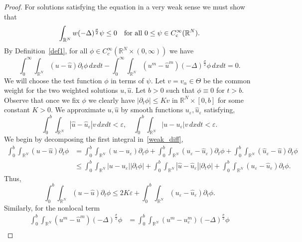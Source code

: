 \documentclass[leqno,12pt]{amsart}
\theoremstyle{definition}
\theoremstyle{remark}
\numberwithin{equation}{section}
\begin{document}
\begin{proof}
For solutions satisfying the equation in a very weak sense we must show that 
\[
    \int_{\mathbb{R}^N}w(-\Delta)^{\frac\sigma2}\psi\leq 0\quad\textup{for all } 0\leq\psi\in C^{\infty}_{\textup{c}}(\mathbb{R}^N).
\]
By Definition~\ref{def1}, for all $\phi\in C^{\infty}_c(\mathbb{R}^N\times (0,\infty))$ we have
\begin{equation}\label{weak_diff}
    \int_{0}^{\infty}\int_{\mathbb{R}^N}(u-\hat{u})\partial_t\phi \,dxdt-\int_{0}^{\infty}\int_{\mathbb{R}^N}(u^m-\hat{u}^m)(-\Delta)^{\frac\sigma2}\phi \,dxdt=0.
\end{equation}
We will choose the test function $\phi$ in terms of $\psi$. Let $v=v_\alpha\in \Theta$ be the common weight for the two weighted solutions $u,\hat{u}$. Let $b>0$ such that $\phi\equiv 0$ for $t>b$. Observe that once we fix $\phi$ we clearly have $|\partial_t\phi|\le Kv$ in $\mathbb{R}^N\times[0,b]$ for some constant $K>0$. We approximate $u,\hat{u}$ by smooth functions $u_\varepsilon,\hat{u}_\varepsilon$ satisfying, 
\begin{equation}\label{5}
 \int_{0}^{b}\int_{\mathbb{R}^N}|\hat{u}-\hat{u}_{\varepsilon}|v\,dxdt<\varepsilon,\quad \int_{0}^{b}\int_{\mathbb{R}^N}|u-u_{\varepsilon}|v\,dxdt<\varepsilon.
\end{equation}
We begin by decomposing the first integral in~\eqref{weak_diff},
\begin{align*}
\displaystyle \int_{0}^{b}\int_{\mathbb{R}^N}(u-\hat{u})\partial_t\phi&\displaystyle= \int_{0}^{b}\int_{\mathbb{R}^N}(u-u_{\varepsilon})\partial_t\phi+ \int_{0}^{b}\int_{\mathbb{R}^N}(u_{\varepsilon}-\hat{u}_{\varepsilon})\partial_t\phi+ \int_{0}^{b}\int_{\mathbb{R}^N}(\hat{u}_{\varepsilon}-\hat{u})\partial_t\phi \\[3mm]
&\displaystyle\leq \int_{0}^{b}\int_{\mathbb{R}^N}|u-u_{\varepsilon}||\partial_t\phi|+ \int_{0}^{b}\int_{\mathbb{R}^N}|\hat{u}-\hat{u}_{\varepsilon}||\partial_t\phi|+ \int_{0}^{b}\int_{\mathbb{R}^N}(u_{\varepsilon}-\hat{u}_{\varepsilon})\partial_t\phi.
\end{align*}
Thus, 
\begin{equation}\label{6}
    \int_{0}^{b}\int_{\mathbb{R}^N}(u-\hat{u})\partial_t\phi\leq 2K\varepsilon+ \int_{0}^{b}\int_{\mathbb{R}^N}(u_{\varepsilon}-\hat{u}_{\varepsilon})\partial_t\phi.
    \end{equation}
Similarly, for the nonlocal term 
\begin{align*}
    \int_{0}^{b}\int_{\mathbb{R}^N}(u^m-\hat{u}^m)(-\Delta)^{\frac\sigma2}\phi&= \int_{0}^{b}\int_{\mathbb{R}^N}(u^m-u_{\varepsilon}^m)(-\Delta)^{\frac\sigma2}\phi\\

\end{align*}
\end{proof}
\end{document}
